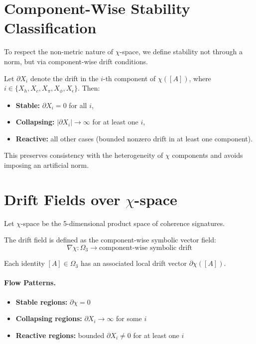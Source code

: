 \section{Component-Wise Stability Classification} \label{component-wise-stability-classification}

To respect the non-metric nature of $\chi$-space, we define stability not through a norm, but via component-wise drift conditions.

\begin{definition}
Let $\partial X_i$ denote the drift in the $i$-th component of $\chi([A])$, where $i \in \{X_h, X_c, X_\pi, X_\phi, X_\epsilon\}$. Then:

\begin{itemize}
    \item \textbf{Stable:} $\partial X_i = 0$ for all $i$,
    \item \textbf{Collapsing:} $|\partial X_i| \to \infty$ for at least one $i$,
    \item \textbf{Reactive:} all other cases (bounded nonzero drift in at least one component).
\end{itemize}
\end{definition}

This preserves consistency with the heterogeneity of $\chi$ components and avoids imposing an artificial norm.

\section{Drift Fields over $\chi$-space} \label{drift-fields-over-chi-space}

Let $\chi$-space be the 5-dimensional product space of coherence signatures.

\begin{definition}
The drift field is defined as the component-wise symbolic vector field:
\begin{equation} \label{eq:drift-field}
\nabla\chi : \Omega_3 \rightarrow \text{component-wise symbolic drift}
\end{equation}
\end{definition}

Each identity $[A] \in \Omega_3$ has an associated local drift vector $\partial\chi([A])$.

\paragraph{Flow Patterns.}
\begin{itemize}
    \item \textbf{Stable regions:} $\partial\chi = 0$
    \item \textbf{Collapsing regions:} $\partial X_i \to \infty$ for some $i$
    \item \textbf{Reactive regions:} bounded $\partial X_i \ne 0$ for at least one $i$
\end{itemize}

